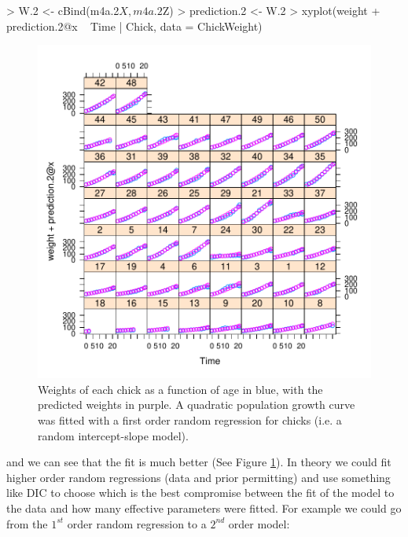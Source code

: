 \documentclass{article}
\begin{document}
\begin{Schunk}
\begin{Sinput}
> W.2 <- cBind(m4a.2$X, m4a.2$Z)
> prediction.2 <- W.2 %
> xyplot(weight + prediction.2@x ~ Time | Chick, data = ChickWeight)
\end{Sinput}
\end{Schunk}


\begin{figure}[!h]
\begin{center}
\includegraphics{Lecture4-022}
\end{center}
\caption{Weights of each chick as a function of age in blue, with the predicted weights in purple. A quadratic population growth curve was fitted with a first order random regression for chicks (i.e. a random intercept-slope model).}
\label{CWpred.2-fig}
\end{figure}

and we can see that the fit is much better (See Figure \ref{CWpred.2-fig}). In theory we could fit higher order random regressions (data and prior permitting) and use something like DIC to choose which is the best compromise between the fit of the model to the data and how many effective parameters were fitted. For example we could go from the $1^{st}$ order random regression to a $2^{nd}$ order model: 
\end{document}
